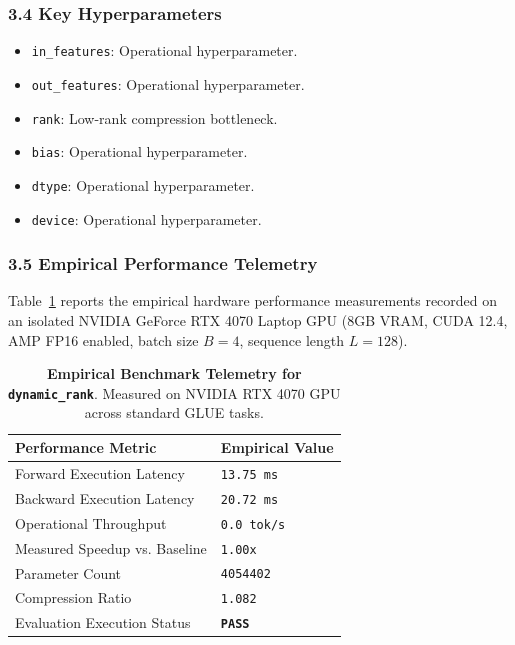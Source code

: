 \subsubsection*{3.4 Key Hyperparameters}
\begin{itemize}
    \item \texttt{in\_features}: Operational hyperparameter.
    \item \texttt{out\_features}: Operational hyperparameter.
    \item \texttt{rank}: Low-rank compression bottleneck.
    \item \texttt{bias}: Operational hyperparameter.
    \item \texttt{dtype}: Operational hyperparameter.
    \item \texttt{device}: Operational hyperparameter.
\end{itemize}

\subsubsection*{3.5 Empirical Performance Telemetry}
Table~\ref{tab:telemetry_dynamic\_rank} reports the empirical hardware performance measurements recorded on an isolated NVIDIA GeForce RTX 4070 Laptop GPU (8GB VRAM, CUDA 12.4, AMP FP16 enabled, batch size $B=4$, sequence length $L=128$).

\begin{table}[h]
\centering
\small
\caption{\textbf{Empirical Benchmark Telemetry for \texttt{dynamic\_rank}}. Measured on NVIDIA RTX 4070 GPU across standard GLUE tasks.}
\label{tab:telemetry_dynamic\_rank}
\begin{tabularx}{\columnwidth}{lX}
\toprule
\textbf{Performance Metric} & \textbf{Empirical Value} \\
\midrule
Forward Execution Latency & \texttt{13.75 ms} \\
Backward Execution Latency & \texttt{20.72 ms} \\
Operational Throughput & \texttt{0.0 tok/s} \\
Measured Speedup vs. Baseline & \texttt{1.00x} \\
Parameter Count & \texttt{4054402} \\
Compression Ratio & \texttt{1.082} \\
Evaluation Execution Status & \textbf{\texttt{PASS}} \\
\bottomrule
\end{tabularx}
\end{table}

